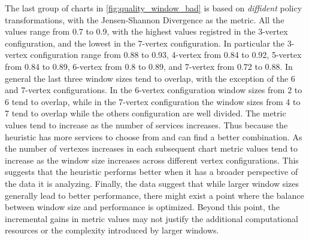 The last group of charts in \cref{fig:quality_window_bad} is based on \textit{diffident} policy transformations, with the Jensen-Shannon Divergence as the metric.
All the values range from 0.7 to 0.9, with the highest values registred in the 3-vertex
configuration, and the lowest in the 7-vertex configuration.
In particular the 3-vertex configuration range from 0.88 to 0.93, 4-vertex from 0.84 to 0.92, 5-vertex from 0.84 to 0.89, 6-vertex from 0.8 to 0.89, and 7-vertex from 0.72 to 0.88.
In general the last three window sizes tend to overlap, with the exception of the 6 and 7-vertex configurations.
In the 6-vertex configuration window sizes from 2 to 6 tend to overlap, while in the 7-vertex configuration the window sizes from 4 to 7 tend to overlap while the others configuration are well divided.
The metric values tend to increase as the number of services increases. Thus because the heuristic has more services to choose from and can find a better combination.
As the number of vertexes increases in each subsequent chart metric values tend to increase as the window size increases across different vertex configurations.
This suggests that the heuristic performs better when it has a broader perspective of the data it is analyzing.
Finally, the data suggest that while larger window sizes generally lead to better performance,
there might exist a point where the balance between window size and performance is optimized.
Beyond this point, the incremental gains in metric values may not justify the additional computational resources or the complexity introduced by larger windows.


